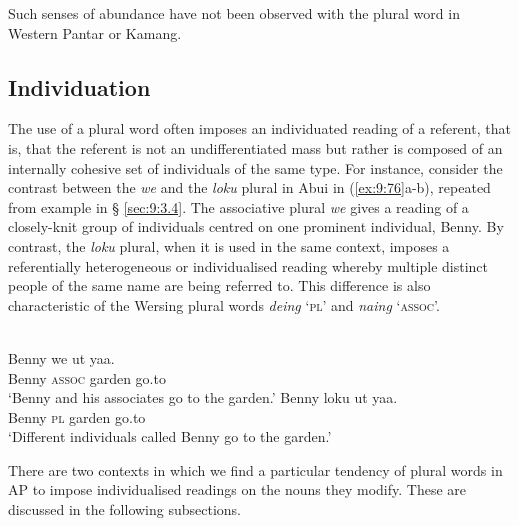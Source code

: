 Such senses of abundance have not been observed with the plural word in Western Pantar or Kamang.

\subsection{Individuation} %
\label{sec:9:4.3}
The use of a plural word often imposes an individuated reading of a referent, that is, that the referent is not an undifferentiated mass but rather is composed of an internally cohesive set of individuals of the same type. For instance, consider the contrast between the \textit{we} and the \textit{loku} plural in Abui in (\ref{ex:9:76}a-b), repeated from example  in {\S} \ref{sec:9:3.4}. The associative plural \textit{we} gives a reading of a closely-knit group of individuals centred on one prominent individual, Benny. By contrast, the \textit{loku} plural, when it is used in the same context, imposes a referentially heterogeneous or individualised reading whereby multiple distinct people of the same name are being referred to. This difference is also characteristic of the Wersing plural words \textit{deing} `\textsc{pl}' and \textit{naing} `\textsc{assoc}'.


\ea%
\label{ex:9:76}
 \\
\ea
\gll Benny we ut yaa. \\
   Benny \textsc{assoc} garden go.to \\
\glt `Benny and his associates go to the garden.'
\ex
\gll Benny loku ut yaa.\\
  Benny \textsc{pl} garden go.to  \\
\glt  `Different individuals called Benny go to the garden.'
\z
\z





There are two contexts in which we find a particular tendency of plural words in AP to impose individualised readings on the nouns they modify. These are discussed in the following subsections.

